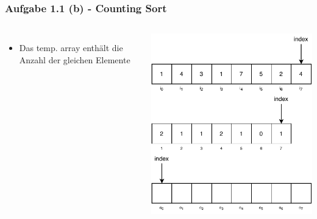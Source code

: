 \documentclass[aspectratio=169]{beamer}
\begin{document}
\begin{frame}
	\frametitle{Aufgabe 1.1 (b) - Counting Sort}
	\begin{columns}[c] %
	
	\begin{itemize}
		\item Das temp. array enthält die Anzahl der gleichen Elemente
	\end{itemize}
	
	\includegraphics[scale=.7]{cs5.pdf}
	
	\end{columns}
	\end{frame}
\end{document}
